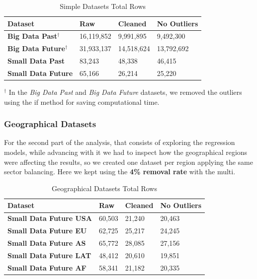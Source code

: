 \documentclass[11pt,english,a4paper,hidelinks]{book}
\begin{document}
\begin{table}[H]
    \centering
    \begin{tabular}{|l|l|l|l|}
        \hline  
        \textbf{Dataset} & \textbf{Raw} & \textbf{Cleaned} & \textbf{No Outliers} \\
        \hline
        \textbf{Big Data Past$^\dagger$} & 16,119,852 & 9,991,895 & 9,492,300 \\
        \hline
        \textbf{Big Data Future$^\dagger$} & 31,933,137 & 14,518,624 & 13,792,692 \\
        \hline 
        \textbf{Small Data Past} & 83,243 & 48,338 & 46,415 \\
        \hline
        \textbf{Small Data Future} & 65,166 & 26,214 & 25,220 \\
        \hline
        \end{tabular}

    \caption{Simple Datasets Total Rows}
    \label{tab:simple_datasets_rows}
\end{table}

\noindent $^\dagger$ In the \textit{Big Data Past} and \textit{Big Data Future} datasets, we removed the outliers using the \acrshort{if} method for saving computational time.

\subsubsection{Geographical Datasets}

\noindent For the second part of the analysis, that consists of exploring the regression models, while advancing with it we had to inspect how the geographical regions were affecting the results, so we created one dataset per region applying the same sector balancing. Here  we kept using the \textbf{4\% removal rate} with the \acrshort{multi}.

\begin{table}[H]
    \centering
    \begin{tabular}{|l|l|l|l|}
        \hline  
        \textbf{Dataset} & \textbf{Raw} & \textbf{Cleaned} & \textbf{No Outliers} \\
        \hline
        \textbf{Small Data Future USA} & 60,503 & 21,240 & 20,463 \\
        \hline
        \textbf{Small Data Future EU} & 62,725 & 25,217 & 24,245 \\
        \hline        
        \textbf{Small Data Future AS} & 65,772 & 28,085 & 27,156\\
        \hline
        \textbf{Small Data Future LAT} & 48,412 & 20,610 & 19,851 \\
        \hline
        \textbf{Small Data Future AF} & 58,341 & 21,182 & 20,335 \\
        \hline
        \end{tabular}

    \caption{Geographical Datasets Total Rows}
    \label{tab:geographical_datasets_rows}
\end{table}
\end{document}
